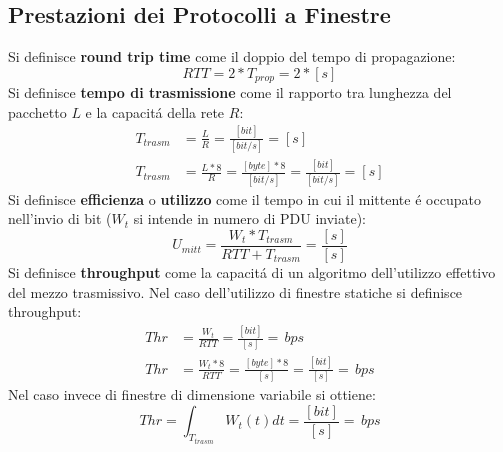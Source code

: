\documentclass[12pt]{article}
\begin{document}
\clearpage
\subsection{Prestazioni dei Protocolli a Finestre}\label{arq-prestazioni-protocolli-finestre-scorrevoli} 
Si definisce \textbf{round trip time} come il doppio del tempo di propagazione:
\begin{equation}\label{eq:rtt}
	RTT = 2 * T_{prop} = 2 * [s]
\end{equation}
Si definisce \textbf{tempo di trasmissione} come il rapporto tra lunghezza del pacchetto $L$ e la capacit\'a della 
rete $R$:
\begin{equation}\label{eq:t-transm}
\begin{split}
	T_{trasm} &= \frac{L}{R} = \frac{[bit]}{[bit/s]} = [s] \\
	T_{trasm} &= \frac{L * 8}{R} = \frac{[byte] * 8}{[bit/s]} = \frac{[bit]}{[bit/s]} = [s]
\end{split}
\end{equation}
Si definisce \textbf{efficienza} o \textbf{utilizzo} come il tempo in cui il mittente \'e occupato nell'invio di bit 
($W_t$ si intende in numero di PDU inviate):
\begin{equation}\label{eq:u-mitt}
	U_{mitt} = \frac{W_t * T_{trasm}}{RTT+T_{trasm}} = \frac{[s]}{[s]}
\end{equation}
Si definisce \textbf{throughput} come la capacit\'a di un algoritmo dell'utilizzo effettivo del mezzo trasmissivo.
Nel caso dell'utilizzo di finestre statiche si definisce throughput:
\begin{equation}\label{eq:throughput-statiche}
\begin{split}
	Thr &= \frac{W_t}{RTT} = \frac{[bit]}{[s]} = \num{}\,\si{bps} \\
    Thr &= \frac{W_t * 8}{RTT} = \frac{[byte] * 8}{[s]} = \frac{[bit]}{[s]} = \num{}\,\si{bps}
\end{split}
\end{equation}
Nel caso invece di finestre di dimensione variabile si ottiene:
\begin{equation}\label{eq:throughput-dinamiche}
    Thr = \int_{T_{trasm}} W_{t}(t) dt = \frac{[bit]}{[s]} = \num{}\,\si{bps}
\end{equation}
\end{document}
